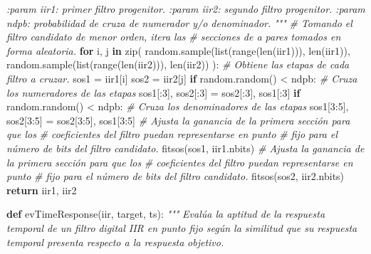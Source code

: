 \documentclass[11pt]{article}
\newenvironment{Shaded}{}{}
\newcommand{\KeywordTok}[1]{\textcolor[rgb]{0.00,0.44,0.13}{\textbf{{#1}}}}
\newcommand{\DecValTok}[1]{\textcolor[rgb]{0.25,0.63,0.44}{{#1}}}
\newcommand{\CommentTok}[1]{\textcolor[rgb]{0.38,0.63,0.69}{\textit{{#1}}}}
\newcommand{\NormalTok}[1]{{#1}}
\newcommand{\ControlFlowTok}[1]{\textcolor[rgb]{0.00,0.44,0.13}{\textbf{{#1}}}}
\newcommand{\OperatorTok}[1]{\textcolor[rgb]{0.40,0.40,0.40}{{#1}}}
\newcommand{\BuiltInTok}[1]{{#1}}
\begin{document}
\begin{Shaded}
\begin{Highlighting}[]
{\CommentTok{    :param iir1: primer filtro progenitor.}
\CommentTok{    :param iir2: segundo filtro progenitor.}
\CommentTok{    :param ndpb: probabilidad de cruza de numerador y/o denominador.}
\CommentTok{    """}
    \CommentTok{# Tomando el filtro candidato de menor orden, itera las}
    \CommentTok{# secciones de a pares tomados en forma aleatoria.}
    \ControlFlowTok{for}\NormalTok{ i, j }\KeywordTok{in} \BuiltInTok{zip}\NormalTok{(}
\NormalTok{        random.sample(}\BuiltInTok{list}\NormalTok{(}\BuiltInTok{range}\NormalTok{(}\BuiltInTok{len}\NormalTok{(iir1))), }\BuiltInTok{len}\NormalTok{(iir1)),}
\NormalTok{        random.sample(}\BuiltInTok{list}\NormalTok{(}\BuiltInTok{range}\NormalTok{(}\BuiltInTok{len}\NormalTok{(iir2))), }\BuiltInTok{len}\NormalTok{(iir2))}
\NormalTok{    ):}
        \CommentTok{# Obtiene las etapas de cada filtro a cruzar.}
\NormalTok{        sos1 }\OperatorTok{=}\NormalTok{ iir1[i]}
\NormalTok{        sos2 }\OperatorTok{=}\NormalTok{ iir2[j]}
        \ControlFlowTok{if}\NormalTok{ random.random() }\OperatorTok{<}\NormalTok{ ndpb:}
            \CommentTok{# Cruza los numeradores de las etapas}
\NormalTok{            sos1[:}\DecValTok{3}\NormalTok{], sos2[:}\DecValTok{3}\NormalTok{] }\OperatorTok{=}\NormalTok{ sos2[:}\DecValTok{3}\NormalTok{], sos1[:}\DecValTok{3}\NormalTok{]}
        \ControlFlowTok{if}\NormalTok{ random.random() }\OperatorTok{<}\NormalTok{ ndpb:}
            \CommentTok{# Cruza los denominadores de las etapas}
\NormalTok{            sos1[}\DecValTok{3}\NormalTok{:}\DecValTok{5}\NormalTok{], sos2[}\DecValTok{3}\NormalTok{:}\DecValTok{5}\NormalTok{] }\OperatorTok{=}\NormalTok{ sos2[}\DecValTok{3}\NormalTok{:}\DecValTok{5}\NormalTok{], sos1[}\DecValTok{3}\NormalTok{:}\DecValTok{5}\NormalTok{]}
        \CommentTok{# Ajusta la ganancia de la primera sección para que los}
        \CommentTok{# coeficientes del filtro puedan representarse en punto}
        \CommentTok{# fijo para el número de bits del filtro candidato.}
\NormalTok{        fitsos(sos1, iir1.nbits)}
        \CommentTok{# Ajusta la ganancia de la primera sección para que los}
        \CommentTok{# coeficientes del filtro puedan representarse en punto}
        \CommentTok{# fijo para el número de bits del filtro candidato.}
\NormalTok{        fitsos(sos2, iir2.nbits)}
    \ControlFlowTok{return}\NormalTok{ iir1, iir2}


\KeywordTok{def}\NormalTok{ evTimeResponse(iir, target, ts):}
    \CommentTok{"""}
\CommentTok{    Evalúa la aptitud de la respuesta temporal de un filtro}
\CommentTok{    digital IIR en punto fijo según la similitud que su}
\CommentTok{    respuesta temporal presenta respecto a la respuesta}
\CommentTok{    objetivo.}

}
\end{Highlighting}
\end{Shaded}
\end{document}
